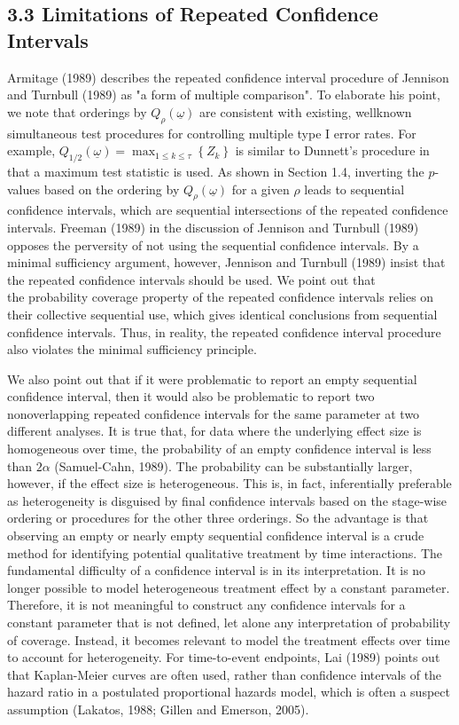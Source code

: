 \documentclass[10pt]{article}
\begin{document}
\subsection*{3.3 Limitations of Repeated Confidence Intervals}
Armitage (1989) describes the repeated confidence interval procedure of Jennison and Turnbull (1989) as "a form of multiple comparison". To elaborate his point, we note that orderings by $Q_{\rho}(\underline{\omega})$ are consistent with existing, wellknown simultaneous test procedures for controlling multiple type I error rates. For example, $Q_{1 / 2}(\underline{\omega})=\max _{1 \leq k \leq \tau}\left\{Z_{k}\right\}$ is similar to Dunnett's procedure in that a maximum test statistic is used. As shown in Section 1.4, inverting the $p$-values based on the ordering by $Q_{\rho}(\underline{\omega})$ for a given $\rho$ leads to sequential confidence intervals, which are sequential intersections of the repeated confidence intervals. Freeman (1989) in the discussion of Jennison and Turnbull (1989) opposes the perversity of not using the sequential confidence intervals. By a minimal sufficiency argument, however, Jennison and Turnbull (1989) insist that the repeated confidence intervals should be used. We point out that\\
the probability coverage property of the repeated confidence intervals relies on their collective sequential use, which gives identical conclusions from sequential confidence intervals. Thus, in reality, the repeated confidence interval procedure also violates the minimal sufficiency principle.

We also point out that if it were problematic to report an empty sequential confidence interval, then it would also be problematic to report two nonoverlapping repeated confidence intervals for the same parameter at two different analyses. It is true that, for data where the underlying effect size is homogeneous over time, the probability of an empty confidence interval is less than $2 \alpha$ (Samuel-Cahn, 1989). The probability can be substantially larger, however, if the effect size is heterogeneous. This is, in fact, inferentially preferable as heterogeneity is disguised by final confidence intervals based on the stage-wise ordering or procedures for the other three orderings. So the advantage is that observing an empty or nearly empty sequential confidence interval is a crude method for identifying potential qualitative treatment by time interactions. The fundamental difficulty of a confidence interval is in its interpretation. It is no longer possible to model heterogeneous treatment effect by a constant parameter. Therefore, it is not meaningful to construct any confidence intervals for a constant parameter that is not defined, let alone any interpretation of probability of coverage. Instead, it becomes relevant to model the treatment effects over time to account for heterogeneity. For time-to-event endpoints, Lai (1989) points out that Kaplan-Meier curves are often used, rather than confidence intervals of the hazard ratio in a postulated proportional hazards model, which is often a suspect assumption (Lakatos, 1988; Gillen and Emerson, 2005).
\end{document}
